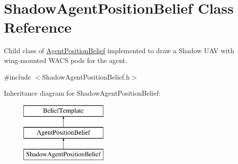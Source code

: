 \hypertarget{class_shadow_agent_position_belief}{
\section{ShadowAgentPositionBelief Class Reference}
\label{class_shadow_agent_position_belief}
}


Child class of \hyperlink{class_agent_position_belief}{AgentPositionBelief} implemented to draw a Shadow UAV with wing-\/mounted WACS pods for the agent.  




{\ttfamily \#include $<$ShadowAgentPositionBelief.h$>$}

Inheritance diagram for ShadowAgentPositionBelief:\begin{figure}[H]
\begin{center}
\leavevmode
\includegraphics[height=3.000000cm]{class_shadow_agent_position_belief}
\end{center}
\end{figure}
